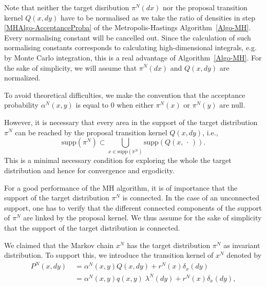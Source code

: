 \begin{rem}
\label{Rem-Omitting constants in densities}
 Note that neither the target disribution $ \pi^{N}(dx) $ nor the proposal transition kernel $ Q(x,dy) $ have to be normalised as we take the ratio of densities in step \ref{MHAlgo-AcceptanceProba} of the Metropolis-Hastings Algorithm~\ref{Algo-MH}. Every normalising constant will be cancelled out. Since the calculation of such normalising constants corresponds to calculating high-dimensional integrals, e.g. by Monte Carlo integration, this is a real advantage of Algorithm~\ref{Algo-MH}. For the sake of simplicity, we will assume that $ \pi^{N}(dx) $ and $ Q(x,dy) $ are normalized.
\end{rem}

To avoid theoretical difficulties, we make the convention that the acceptance probability $ \alpha^{N}(x,y) $ is equal to 0 when either $ \pi^{N}(x) $ or $ \pi^{N}(y) $ are null.

\begin{rem}
\label{Rem-SupportOfProposals}
However, it is necessary that every area in the support of the target distribution $ \pi^{N} $ can be reached by the proposal transition kernel $ Q(x,dy) $, i.e.,
\begin{equation*}
 \text{supp} (\pi^{N}) \subset \bigcup_{x \in \text{supp} (\pi^{N}) } \text{supp} (Q(x, \, \cdot \,)).
\end{equation*}
This is a minimal necessary condition for exploring the whole the target distribution and hence for convergence and ergodicity.

For a good performance of the MH algorithm, it is of importance that the support of the target distribution $ \pi^{N} $ is connected. In the case of an unconnected support, one has to verify that the different connected components of the support of $ \pi^{N} $ are linked by the proposal kernel. We thus assume for the sake of simplicity that the support of the target distribution is connected.
\end{rem}


We claimed that the Markov chain $ x^{N} $ has the target distribution $ \pi^{N} $ as invariant distribution. To support this, we introduce the transition kernel of $ x^{N} $ denoted by
\begin{equation}
\label{MH-TransitionKernelOfMHChain}
\begin{split}
 P^{N}(x,dy) & \; = \alpha^{N}(x,y) Q(x, dy) + r^{N}(x)\delta_{x}(dy) \\
 & \; = \alpha^{N}(x,y) q(x,y) \; \lambda^{N}(dy) + r^{N}(x)\delta_{x}(dy),
\end{split}
\end{equation}

